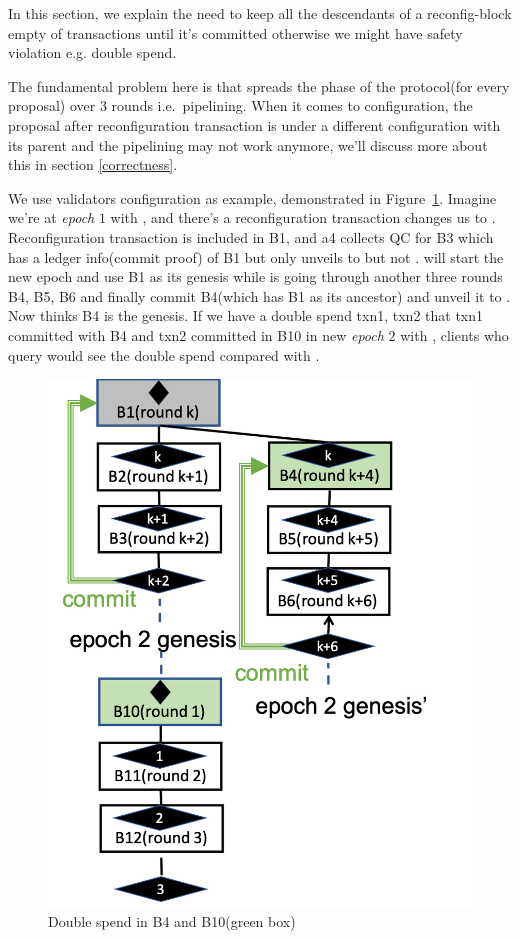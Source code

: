 In this section, we explain the need to keep all the descendants of a reconfig-block empty of transactions until it's committed otherwise we might
have safety violation e.g. double spend.

The fundamental problem here is that \LBFT spreads the phase of the protocol(for every proposal) over 3 rounds i.e.\ pipelining.
When it comes to configuration, the proposal after reconfiguration transaction is under a different configuration with its
parent and the pipelining may not work anymore, we'll discuss more about this in section \ref{correctness}.

We use validators configuration as example, demonstrated in Figure~\ref{fig:safety}. Imagine we're at \emph{epoch} $1$ with
, and there's a reconfiguration transaction changes us to .
Reconfiguration transaction is included in B1, and a4 collects QC for B3 which has a ledger info(commit proof) of B1 but only unveils to  but not .  will start the new epoch and use B1 as its genesis while 
is going through another three rounds B4, B5, B6 and finally commit B4(which has B1 as its ancestor) and unveil it to .
Now  thinks B4 is the genesis. If we have a double spend txn1, txn2 that txn1 committed with B4 and txn2 committed in B10 in
new \emph{epoch} $2$ with , clients who query  would see the double spend compared with .

\begin{figure}[ht]
			\centering
		\includegraphics[scale=.45]{figures/reconfig-safety.png}
	\caption{Double spend in B4 and B10(green box)}
\label{fig:safety}
\end{figure}

